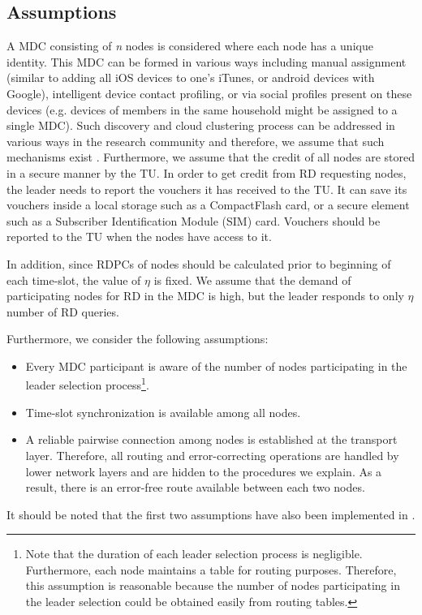 \documentclass[journal,12pt, onecolumn]{IEEEtran}
\begin{document}
\subsection{Assumptions}\label{section:assumptions}
A MDC consisting of \textit{n} nodes is considered where each node has a unique identity. This MDC can be formed in various ways including manual assignment (similar to adding all iOS devices to one's iTunes, or android devices with Google), intelligent device
contact profiling, or via social profiles present on these devices (e.g. devices of members in the same household might be assigned to a single MDC). Such discovery and cloud clustering process can be addressed in various ways in the research
community \cite{x27} and therefore, we assume that such mechanisms exist \cite{x335}. Furthermore, we assume that the credit of all nodes are stored in a secure manner by the TU. In order to get credit from RD requesting nodes, the leader needs to report the vouchers it has received to the TU. It can save its vouchers inside a local storage such as a CompactFlash card, or a secure element such as a Subscriber Identification Module (SIM) card. Vouchers should be reported to the TU when the nodes have access to it.

In addition, since RDPCs of nodes should be calculated prior to beginning of each time-slot, the value of $\eta$ is fixed. We assume that the demand of participating nodes for RD in the MDC is high, but the leader responds to only $\eta$ number of RD queries.

Furthermore, we consider the following assumptions: 
\begin{itemize}
\item Every MDC participant is aware of the number of nodes participating in the leader selection process\footnote[1]{
Note that the duration of each leader selection process is negligible. Furthermore, each node maintains a table for routing purposes. Therefore, this assumption is reasonable because the number of nodes participating in the leader selection could be obtained easily from routing tables.}.
\item Time-slot synchronization is available among all nodes. 
\item A reliable pairwise connection among nodes is established at the transport layer. Therefore, all routing and error-correcting operations are handled by lower network layers and are hidden to the procedures we explain. As a result, there is an error-free route available between each two nodes. 



\end{itemize}
It should be noted that the first two assumptions have also been implemented in \cite{x22}.
\end{document}
